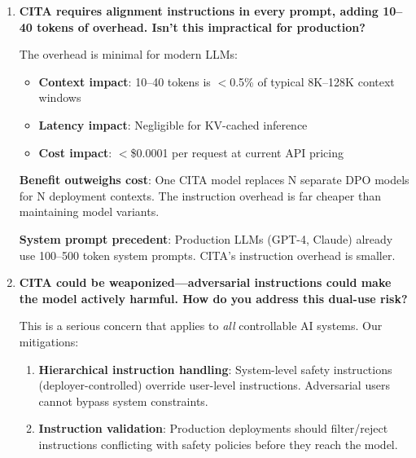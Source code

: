 \begin{enumerate}[label=\textbf{Q\arabic*.}, leftmargin=*, itemsep=8pt]
\textbf{Practical cost}: Total training time is $\sim$4.5 hours on A100-40GB. The complexity is in methodology, not compute.

\vspace{4mm}

\item \textbf{CITA requires alignment instructions in every prompt, adding 10--40 tokens of overhead. Isn't this impractical for production?}

 The overhead is minimal for modern LLMs:

\begin{itemize}[leftmargin=*,itemsep=2pt]
    \item \textbf{Context impact}: 10--40 tokens is $<$0.5\% of typical 8K--128K context windows
    \item \textbf{Latency impact}: Negligible for KV-cached inference
    \item \textbf{Cost impact}: $<$\$0.0001 per request at current API pricing
\end{itemize}

\textbf{Benefit outweighs cost}: One CITA model replaces N separate DPO models for N deployment contexts. The instruction overhead is far cheaper than maintaining model variants.

\textbf{System prompt precedent}: Production LLMs (GPT-4, Claude) already use 100--500 token system prompts. CITA's instruction overhead is smaller.

\vspace{4mm}

\item \textbf{CITA could be weaponized---adversarial instructions could make the model actively harmful. How do you address this dual-use risk?}

 This is a serious concern that applies to \textit{all} controllable AI systems. Our mitigations:

\begin{enumerate}[leftmargin=*,itemsep=2pt]
    \item \textbf{Hierarchical instruction handling}: System-level safety instructions (deployer-controlled) override user-level instructions. Adversarial users cannot bypass system constraints.

    \item \textbf{Instruction validation}: Production deployments should filter/reject instructions conflicting with safety policies before they reach the model.


\end{enumerate}
\end{enumerate}
